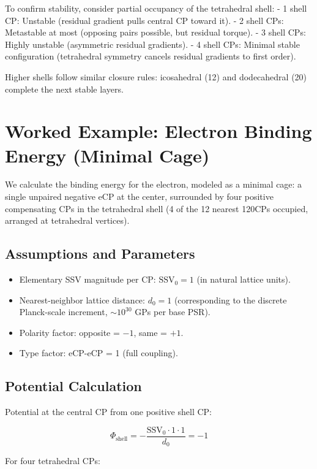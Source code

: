 \documentclass[11pt]{article}
\begin{document}
To confirm stability, consider partial occupancy of the tetrahedral shell:
- 1 shell CP: Unstable (residual gradient pulls central CP toward it).
- 2 shell CPs: Metastable at most (opposing pairs possible, but residual torque).
- 3 shell CPs: Highly unstable (asymmetric residual gradients).
- 4 shell CPs: Minimal stable configuration (tetrahedral symmetry cancels residual gradients to first order).

Higher shells follow similar closure rules: icosahedral (12) and dodecahedral (20) complete the next stable layers.

\section{Worked Example: Electron Binding Energy (Minimal Cage)}

We calculate the binding energy for the electron, modeled as a minimal cage: a single unpaired negative eCP at the center, surrounded by four positive compensating CPs in the tetrahedral shell (4 of the 12 nearest 120CPs occupied, arranged at tetrahedral vertices).

\subsection{Assumptions and Parameters}
\begin{itemize}
    \item Elementary SSV magnitude per CP: $\text{SSV}_0 = 1$ (in natural lattice units).
    \item Nearest-neighbor lattice distance: $d_0 = 1$ (corresponding to the discrete Planck-scale increment, $\sim 10^{30}$ GPs per base PSR).
    \item Polarity factor: opposite = $-1$, same = $+1$.
    \item Type factor: eCP-eCP = 1 (full coupling).
\end{itemize}

\subsection{Potential Calculation}
Potential at the central CP from one positive shell CP:

\begin{equation}
\Phi_{\text{shell}} = - \frac{\text{SSV}_0 \cdot 1 \cdot 1}{d_0} = -1
\end{equation}

For four tetrahedral CPs:
\end{document}
